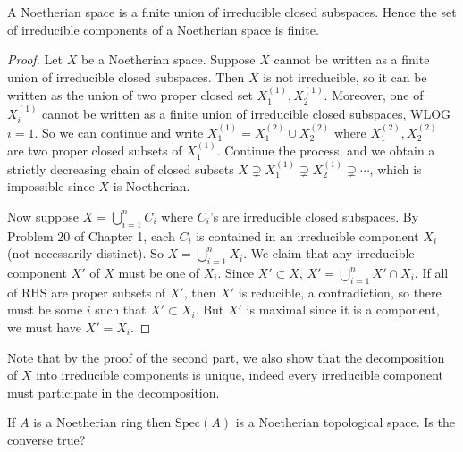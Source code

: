\documentclass{solution}
\begin{document}
\begin{problem}
    A Noetherian space is a finite union of irreducible closed subspaces. Hence the set of irreducible components of a Noetherian space is finite.
\end{problem}

\begin{proof}
    Let $X$ be a Noetherian space. Suppose $X$ cannot be written as a finite union of irreducible closed subspaces. Then $X$ is not irreducible, so it can be written as the union of two proper closed set $X_1^{(1)}, X_2^{(1)}$. Moreover, one of $X_i^{(1)}$ cannot be written as a finite union of irreducible closed subspaces, WLOG $i = 1$. So we can continue and write $X_1^{(1)} = X_1^{(2)} \cup X_2^{(2)}$ where $X_1^{(2)}, X_2^{(2)}$ are two proper closed subsets of $X_1^{(1)}$. Continue the process, and we obtain a strictly decreasing chain of closed subsets $X \supsetneq X_1^{(1)} \supsetneq X_2^{(1)} \supsetneq \cdots$, which is impossible since $X$ is Noetherian.

    Now suppose $X = \bigcup\limits_{i = 1}^{n} C_i$ where $C_i$'s are irreducible closed subspaces. By Problem 20 of Chapter 1, each $C_i$ is contained in an irreducible component $X_i$ (not necessarily distinct). So $X = \bigcup\limits_{i = 1}^{n} X_i$. We claim that any irreducible component $X'$ of $X$ must be one of $X_i$. Since $X' \subset X$, $X' = \bigcup\limits_{i = 1}^{n} X' \cap X_i$. If all of RHS are proper subsets of $X'$, then $X'$ is reducible, a contradiction, so there must be some $i$ such that $X' \subset X_i$. But $X'$ is maximal since it is a component, we must have $X' = X_i$.
\end{proof}

{\color{red} Note that by the proof of the second part, we also show that the decomposition of $X$ into irreducible components is unique, indeed every irreducible component must participate in the decomposition.}

\begin{problem}
    If $A$ is a Noetherian ring then $\mathrm{Spec}(A)$ is a Noetherian topological space. Is the converse true?
\end{problem}
\end{document}
